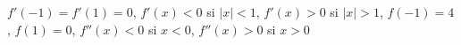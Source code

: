 \item $f'(-1) = f'(1) = 0$, $f'(x) < 0$ si $|x| < 1$, $f'(x) > 0$ si $|x| > 1$, $f(-1) = 4$, $f(1) = 0$, $f''(x) < 0$ si $x < 0$, $f''(x) > 0$ si $x > 0$
